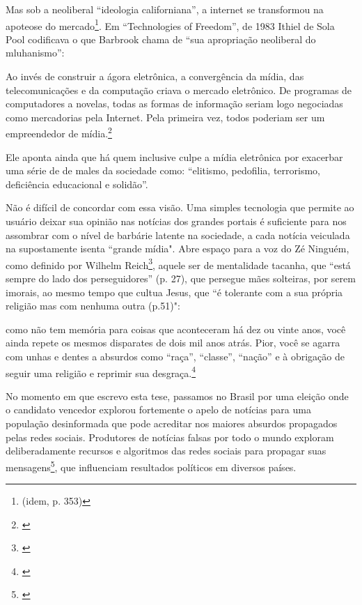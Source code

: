 Mas sob a neoliberal ``ideologia californiana'', a internet se transformou na apoteose do mercado\footnote{(idem, p. 353)}. Em ``Technologies of Freedom'', de 1983 Ithiel de Sola Pool codificava o que Barbrook chama de ``sua apropriação neoliberal do mluhanismo'':
\begin{citacao}
Ao invés de construir a ágora eletrônica, a convergência da mídia, das telecomunicações e da computação criava o mercado eletrônico. De programas de computadores a novelas, todas as formas de informação seriam logo negociadas como mercadorias pela Internet. Pela primeira vez, todos poderiam ser um empreendedor de mídia.\footnote{\cite[348]{Barbrook2009}}
\end{citacao}

Ele aponta ainda que há quem inclusive culpe a mídia eletrônica por exacerbar uma série de de males da sociedade como: ``elitismo, pedofilia, terrorismo, deficiência educacional e solidão''. 

Não é difícil de concordar com essa visão. Uma simples tecnologia que permite ao usuário deixar sua opinião nas notícias dos grandes portais é suficiente para nos assombrar com o nível de barbárie latente na sociedade, a cada notícia veiculada na supostamente isenta ``grande mídia". Abre espaço para a voz do Zé Ninguém, como definido por Wilhelm Reich\footnote{\cite{reich1998escute}}, aquele ser de mentalidade tacanha, que ``está sempre do lado dos perseguidores'' (p. 27), que persegue mães solteiras, por serem imorais, ao mesmo tempo que cultua Jesus, que ``é tolerante com a sua própria religião mas com nenhuma outra (p.51)":

\begin{citacao}
como não tem memória para coisas que aconteceram há dez ou vinte anos, você ainda repete os mesmos disparates de dois mil anos atrás. Pior, você se agarra com unhas e dentes a absurdos como ``raça'', ``classe'', ``nação'' e à obrigação de seguir uma religião e reprimir sua desgraça.\footnote{\cite[101]{reich1998escute}}
\end{citacao}

No momento em que escrevo esta tese, passamos no Brasil por uma eleição onde o candidato vencedor explorou fortemente o apelo de notícias para uma população desinformada que pode acreditar nos maiores absurdos propagados pelas redes sociais. Produtores de notícias falsas por todo o mundo exploram deliberadamente recursos e algoritmos das redes sociais para propagar suas mensagens\footnote{\cite{Martens2018}}, que influenciam resultados políticos em diversos países.

